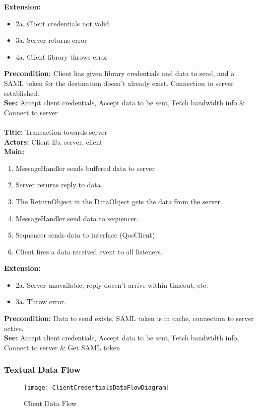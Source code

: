 		\textbf{Extension:}
		\begin{itemize}
			  \item 2a. Client credentials not valid
			  \item 3a. Server returns error
			  \item 4a. Client library throws error
		\end{itemize}
		\textbf{Precondition:} Client has given library credentials and data to send, and a SAML token for the destination doesn’t already exist. Connection to server established. \\
		\textbf{See:} Accept client credentials, Accept data to be sent, Fetch bandwidth info & Connect to server
		\\\\
		\textbf{Title:} Transaction towards server \\
		\textbf{Actors:} Client lib, server, client \\
		\textbf{Main:}
		\begin{enumerate}
			\item MessageHandler sends buffered data to server
			\item Server returns reply to data.
			\item The ReturnObject in the DataObject gets the data from the server.
			\item MessageHandler send data to sequencer.
			\item Sequencer sends data to interface (QosClient)
			\item Client fires a data received event to all listeners.
		\end{enumerate}
		\textbf{Extension:}
		\begin{itemize}
			 \item[] 2a. Server unavailable, reply doesn’t arrive within timeout, etc.
			 \item[] 3a. Throw error.
		\end{itemize}
		\textbf{Precondition:} Data to send exists, SAML token is in cache, connection to server active.\\
		\textbf{See:} Accept client credentials, Accept data to be sent, Fetch bandwidth info, Connect to server & Get SAML token
		
		
	\subsubsection{Textual Data Flow}\label{Textual Client Data Flow}
        \begin{figure}[h]
        \centering
        \texttt{[image: ClientCredentialsDataFlowDiagram]}
        \caption{Client Data Flow}
        \label{fig:ClientCredentialsDataFlowDiagram}
    \end{figure}
    
